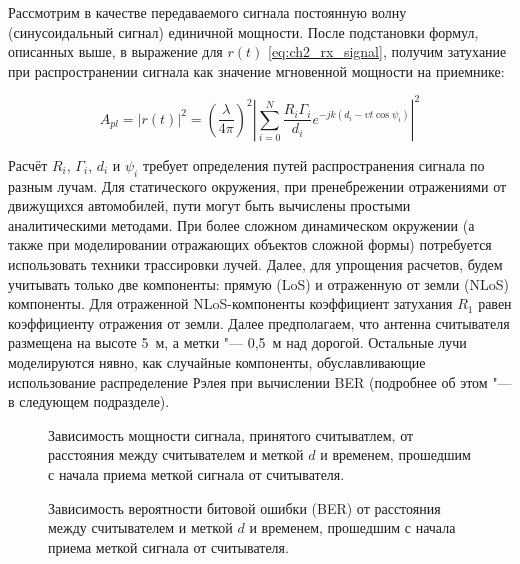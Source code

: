 Рассмотрим в качестве передаваемого сигнала постоянную волну (синусоидальный сигнал) единичной мощности. После подстановки формул, описанных выше, в выражение для $r(t)$ \eqref{eq:ch2_rx_signal}, получим затухание при распространении сигнала как значение мгновенной мощности на приемнике:

\begin{equation}
	A_{pl} = |r(t)|^2 = \left(\frac{\lambda}{4\pi}\right)^2
		\left|\sum\limits_{i=0}^{N} \frac{R_i\Gamma_i}{d_i}
		e^{-jk(d_i-\upsilon t \cos{\psi_i})}\right|^2
	\label{eq:ch2_pathloss}
\end{equation}

Расчёт $R_i$, $\Gamma_i$, $d_i$ и $\psi_i$ требует определения путей распространения сигнала по разным лучам. Для статического окружения, при пренебрежении отражениями от движущихся автомобилей, пути могут быть вычислены простыми аналитическими методами. При более сложном динамическом окружении (а также при моделировании отражающих объектов сложной формы) потребуется использовать техники трассировки лучей. Далее, для упрощения расчетов, будем учитывать только две компоненты: прямую (LoS) и отраженную от земли (NLoS) компоненты. Для отраженной NLoS-компоненты коэффициент затухания $R_1$ равен коэффициенту отражения от земли. Далее предполагаем, что антенна считывателя размещена на высоте 5~м, а метки "--- 0,5~м над дорогой. Остальные лучи моделируются нявно, как случайные компоненты,  обуславливающие использование распределение Рэлея при вычислении BER (подробнее об этом "--- в следующем подразделе).

\begin{figure}[!t]
  \caption[Зависимость мощности сигнала, принятого считывателем, от расстояния и времени]{Зависимость мощности сигнала, принятого считыватлем, от расстояния между считывателем и меткой $d$ и временем, прошедшим с начала приема меткой сигнала от считывателя.}
	\label{fig:ch2_power_doppler}
\end{figure}

\begin{figure}[!t]
	\caption[Зависимость BER от расстояния и времени]{Зависимость вероятности битовой ошибки (BER) от расстояния между считывателем и меткой $d$ и временем, прошедшим с начала приема меткой сигнала от считывателя.}
	\label{fig:ch2_ber_doppler}
\end{figure}



